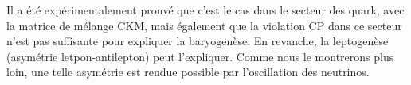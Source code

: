 			Il a été expérimentalement prouvé que c'est le cas dans le secteur des quark\cite{Collaboration2006,Charles2004,Kobayashi1973}, avec la matrice de mélange CKM, mais également que la violation CP dans ce secteur n'est pas suffisante pour expliquer la baryogenèse\cite{Riotto1998}. En revanche, la leptogenèse (asymétrie letpon-antilepton) peut l'expliquer\cite{Davidson2008}. Comme nous le montrerons plus loin, une telle asymétrie est rendue possible par l'oscillation des neutrinos.
			
			
        
